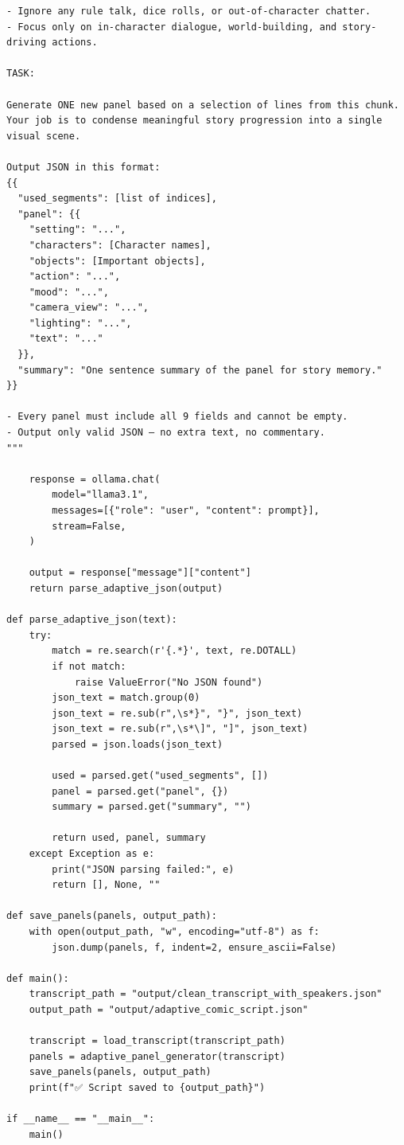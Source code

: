\begin{lstlisting}[style=pythonstyle, caption={TextToScript.py}, label={lst:TextToScript.py}]
- Ignore any rule talk, dice rolls, or out-of-character chatter.
- Focus only on in-character dialogue, world-building, and story-driving actions.

TASK:

Generate ONE new panel based on a selection of lines from this chunk. Your job is to condense meaningful story progression into a single visual scene.

Output JSON in this format:
{{
  "used_segments": [list of indices],
  "panel": {{
    "setting": "...",
    "characters": [Character names],
    "objects": [Important objects],
    "action": "...",
    "mood": "...",
    "camera_view": "...",
    "lighting": "...",
    "text": "..."
  }},
  "summary": "One sentence summary of the panel for story memory."
}}

- Every panel must include all 9 fields and cannot be empty.
- Output only valid JSON — no extra text, no commentary.
"""

    response = ollama.chat(
        model="llama3.1",
        messages=[{"role": "user", "content": prompt}],
        stream=False,
    )

    output = response["message"]["content"]
    return parse_adaptive_json(output)

def parse_adaptive_json(text):
    try:
        match = re.search(r'{.*}', text, re.DOTALL)
        if not match:
            raise ValueError("No JSON found")
        json_text = match.group(0)
        json_text = re.sub(r",\s*}", "}", json_text)
        json_text = re.sub(r",\s*\]", "]", json_text)
        parsed = json.loads(json_text)

        used = parsed.get("used_segments", [])
        panel = parsed.get("panel", {})
        summary = parsed.get("summary", "")

        return used, panel, summary
    except Exception as e:
        print("JSON parsing failed:", e)
        return [], None, ""

def save_panels(panels, output_path):
    with open(output_path, "w", encoding="utf-8") as f:
        json.dump(panels, f, indent=2, ensure_ascii=False)

def main():
    transcript_path = "output/clean_transcript_with_speakers.json"
    output_path = "output/adaptive_comic_script.json"

    transcript = load_transcript(transcript_path)
    panels = adaptive_panel_generator(transcript)
    save_panels(panels, output_path)
    print(f"✅ Script saved to {output_path}")

if __name__ == "__main__":
    main()

\end{lstlisting}

